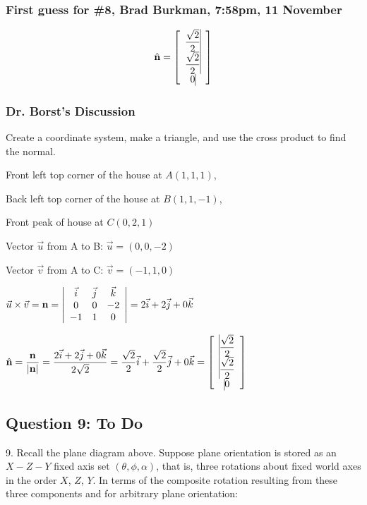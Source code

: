 \documentclass[11pt]{article}
\begin{document}
\begin{spacing}{1.2}
\subsubsection{First guess for \#8, Brad Burkman, 7:58pm, 11 November}
$$\hat{\mathbf{n}} = 
\left[
\begin{array}{>{\displaystyle}c<{\vrule width 0pt height 24pt depth 8pt}}
	 \frac{\sqrt2}{2}\cr
	 \frac{\sqrt2}{2}\cr
	 0 
\end{array}
\right]
$$

\subsubsection{Dr. Borst's Discussion}

Create a coordinate system, make a triangle, and use the cross product to find the normal.  

Front left top corner of the house at $A(1,1,1)$,

Back left top corner of the house at $B(1,1,-1)$,

Front peak of house at $\displaystyle C\left( 0,2, 1\right)$

Vector $\vec{u}$ from A to B: $\vec{u} = (0,0,-2)$

Vector $\vec{v}$ from A to C:  $\displaystyle\vec{v} = \left( -1,1, 0 \right)$

$\displaystyle
\vec{u} \times \vec{v} = {\mathbf{n}} = 
\left|
	\begin{array}{ccc}
		\vec{i} & \vec{j} & \vec{k} \cr
		0 & 0 & -2 \cr
		-1 & 1 & 0 \cr
	\end{array}
\right|
= 2\vec{i}  +2\vec{j} + 0\vec{k}
$

$\displaystyle
\hat{\mathbf{n}} = 
\frac{\mathbf{n}}{|\mathbf{n}|}
= \frac{2\vec{i} + 2 \vec{j} + 0 \vec{k}}{2\sqrt2} = \frac{\sqrt2}{2}\vec{i} + \frac{\sqrt2}{2} \vec{j} + 0 \vec{k}
=
\left[
	\begin{array}{>{\displaystyle\vrule width 0pt height 16pt depth 12pt}c}
		\frac{\sqrt2}{2} \cr
		\frac{\sqrt2}{2} \cr
		0 \cr
	\end{array}
\right]
$

\subsection{Question 9:  To Do}
9.  Recall the plane diagram above.  Suppose plane orientation is stored as an $X-Z-Y$ fixed axis set $(\theta, \phi, \alpha)$, that is, three rotations about fixed world axes in the order $X$, $Z$, $Y$.  In terms of the composite rotation resulting from these three components and for arbitrary plane orientation:


\end{spacing}
\end{document}
